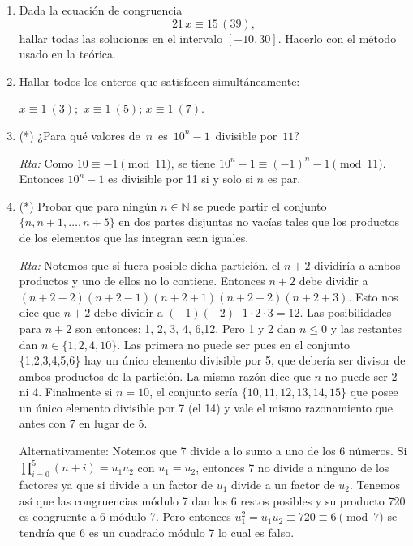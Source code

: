 \documentclass[a4paper,12pt,twoside,spanish,reqno]{amsbook}
\numberwithin{equation}{section}
\newcommand{\rta}{\noindent\textit{Rta: }}
\newcommand \N{{\mathbb N}}
\begin{document}
\begin{enumerate}
\item Dada la ecuación de congruencia
$$21\,x\equiv 15 \, (39),$$
hallar todas las soluciones en el intervalo $[-10,30]$. Hacerlo con el método usado en la teórica. 


\item Hallar todos los enteros que satisfacen simultáneamente:

$x \equiv 1\ ( 3); $ \qquad $x \equiv 1 \ ( 5)$; \qquad $x \equiv 1\ ( 7)$.

    
    \item (*) ¿Para qu\'e valores de \,$n$\, es \,$10^n-1$\, divisible por \,$11$?
    
    \rta Como $10\equiv -1 \pmod{11}$, se tiene $10^{n}-1\equiv(-1)^n-1 \pmod{11}$. Entonces $10^n-1$ es divisible por 11 si y solo si $n$ es par.
    
    
    
    \item (*) Probar que para ningún $n\in\N$ se puede partir el conjunto $\{n,n+1,\ldots, n+5\}$ en dos partes
    disjuntas no vacías tales que los productos de los elementos que las integran sean iguales.
    
    \rta Notemos que si fuera posible dicha partición. el $n+2$ dividiría a ambos productos y uno de ellos no lo contiene.
    Entonces $n+2$ debe dividir a $(n+2-2)(n+2-1)(n+2+1)(n+2+2)(n+2+3)$. Esto nos dice que $n+2$ debe dividir a 
    $(-1)(-2)\cdot1\cdot2\cdot3=12$. Las posibilidades para $n+2$ son entonces: 1, 2, 3, 4, 6,12.
    Pero 1 y 2 dan $n\le 0$ y las restantes dan $n\in \{1, 2, 4, 10\}$. Las primera no puede ser pues en el conjunto \{1,2,3,4,5,6\} hay un único elemento divisible por 5, que debería ser divisor de ambos productos de la partición.
    La misma razón dice que $n$ no puede ser 2 ni 4. Finalmente si $n=10$, el conjunto sería $\{10,11,12,13,14,15\}$ que posee un único elemento divisible por 7 (el 14) y vale el mismo razonamiento que antes con 7 en lugar de 5.
    
    Alternativamente: Notemos que 7 divide a lo sumo a uno de los 6 números. Si $\prod_{i=0}^5(n+i)=u_1u_2$ con $u_1=u_2$, entonces 7 no divide a ninguno de los factores ya que si divide a un factor de $u_1$ divide a un factor de $u_2$. Tenemos así que las congruencias módulo 7 dan los 6 restos posibles y su producto 720 es congruente a 6 módulo 7. Pero entonces $u_1^2=u_1u_2\equiv 720\equiv 6 \pmod{7}$ se tendría que 6 es un cuadrado módulo 7 lo cual es falso.
    
    
    

\end{enumerate}
\end{document}
